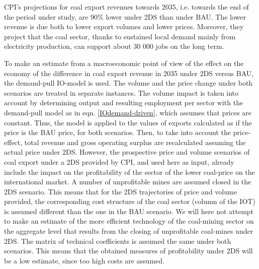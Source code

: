 \documentclass[12pt,english]{article}
\begin{document}
CPI's projections for coal export revenues towards 2035, i.e. towards the end of the period under study, are 90\% lower under 2DS than under BAU. The lower revenue is due both to lower export volumes and lower prices. Moreover, they project that the coal sector, thanks to sustained local demand mainly from electricity production, can support about 30 000 jobs on the long term.%

To make an estimate from a macroeconomic point of view of the effect on the economy of the difference in coal export revenue in 2035 under 2DS versus BAU, the demand-pull IO-model is used. %
The volume and the price change under both scenarios are treated in separate instances. The volume impact is taken into account by determining output and resulting employment per sector with the demand-pull model as in eqn. \ref{IOdemand-driven}, which assumes that prices are constant. Thus, the model is applied to the values of exports calculated as if the price is the BAU price, for both scenarios. Then, to take into account the price-effect, total revenue and gross operating surplus are recalculated assuming the actual price under 2DS. However, %
the prospective price and volume scenarios of coal export under a 2DS provided by CPI, and used here as input, already include the impact on the profitability of the sector of the lower coal-price on the international market. A number of unprofitable mines are assumed closed in the 2DS scenario. This means that for the 2DS trajectories of price and volume provided, the corresponding cost structure of the coal sector (column of the IOT) is assumed different than the one in the BAU scenario. We will here not attempt to make an estimate of the more efficient technology of the coal-mining sector on the aggregate level that results from the closing of unprofitable coal-mines under 2DS. The matrix of technical coefficients is assumed the same under both scenarios. This means that the obtained measures of profitability under 2DS will be a low estimate, since too high costs are assumed.
\end{document}
